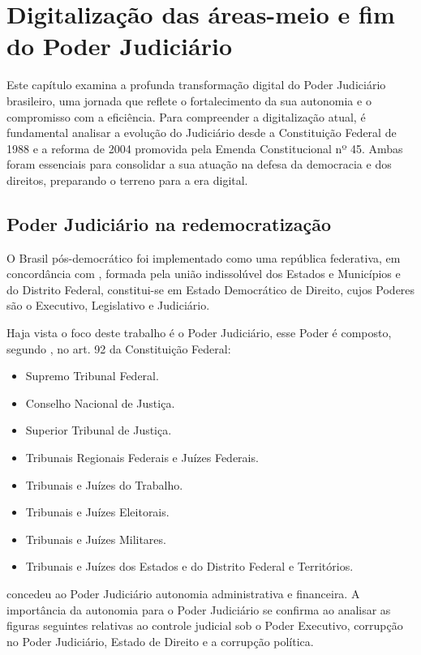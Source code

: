 \chapter{Digitalização das áreas-meio e fim do Poder Judiciário}

Este capítulo examina a profunda transformação digital do Poder Judiciário brasileiro, uma jornada que reflete o fortalecimento da sua autonomia e o compromisso com a eficiência. Para compreender a digitalização atual, é fundamental analisar a evolução do Judiciário desde a Constituição Federal de 1988 e a reforma de 2004 promovida pela Emenda Constitucional nº 45. Ambas foram essenciais para consolidar a sua atuação na defesa da democracia e dos direitos, preparando o terreno para a era digital.

\section{Poder Judiciário na redemocratização}

O Brasil pós-democrático foi implementado como uma república  federativa, em concordância com \cite{cf88}, formada pela união indissolúvel dos Estados e Municípios e do Distrito Federal, constitui-se em Estado Democrático de Direito, cujos Poderes são o Executivo, Legislativo e Judiciário.

Haja vista o foco deste trabalho é o Poder Judiciário, esse Poder é composto, segundo \cite{cf88}, no art. 92 da Constituição Federal:

\begin{itemize}
    \item Supremo Tribunal Federal.
    \item Conselho Nacional de Justiça.
    \item Superior Tribunal de Justiça.
    \item Tribunais Regionais Federais e Juízes Federais.
    \item Tribunais e Juízes do Trabalho.
    \item Tribunais e Juízes Eleitorais.
    \item Tribunais e Juízes Militares.
    \item  Tribunais e Juízes dos Estados e do Distrito Federal e Territórios.
\end{itemize}

\cite{cf88} concedeu ao Poder Judiciário autonomia administrativa e financeira. A importância da autonomia para o Poder Judiciário se confirma ao analisar as figuras seguintes relativas ao controle judicial sob o Poder Executivo,  corrupção no Poder Judiciário, Estado de Direito e a corrupção política.

